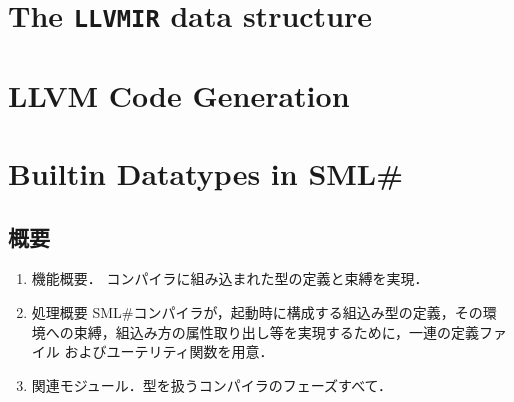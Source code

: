 \documentclass{jbook}
\newcommand{\txt}[2]{#2}
\newcommand{\smlsharp}{SML\#}
\newcommand{\code}[1]{\mbox{\large\tt #1}}
\begin{document}
\chapter{\txt
{\code{LLVMIR}データ構造}
{The \code{LLVMIR} data structure}
}
\label{chap:LLVMIR}

\chapter{\txt
{LLVMコード生成}
{LLVM Code Generation}
}
\label{chap:LLVMCodegeneration}

\chapter{\txt
{\smlsharp{}の組込データ型}
{Builtin Datatypes in \smlsharp{}}
}
\label{chap:bootstraping}

\section{概要}
\begin{enumerate}
\item 機能概要．
	コンパイラに組み込まれた型の定義と束縛を実現．
\item 処理概要
	\smlsharp{}コンパイラが，起動時に構成する組込み型の定義，その環
境への束縛，組込み方の属性取り出し等を実現するために，一連の定義ファイル
およびユーテリティ関数を用意．
\item 関連モジュール．型を扱うコンパイラのフェーズすべて．

\end{enumerate}
\end{document}
